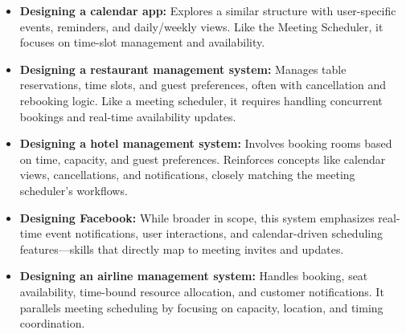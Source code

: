 \begin{itemize}
\item
\protect{}\label{euwRmqTf_2P4JGXqY1GlO}
\textbf{Designing a calendar app:} Explores a similar structure with user-specific events, reminders, and daily/weekly views. Like the Meeting Scheduler, it focuses on time-slot management and availability.
\item
\protect{}\label{9GEUsbY1YnVnW01c-IVVW}
\textbf{Designing a restaurant management system:} Manages table reservations, time slots, and guest preferences, often with cancellation and rebooking logic. Like a meeting scheduler, it requires handling concurrent bookings and real-time availability updates.
\item
\protect{}\label{1EG0RtqM_UbQRwEyptPsa}
\textbf{Designing a hotel management system:} Involves booking rooms based on time, capacity, and guest preferences. Reinforces concepts like calendar views, cancellations, and notifications, closely matching the meeting scheduler's workflows.
\item
\protect{}\label{44SOyW1kz4b27mk1IJX-O}
\textbf{Designing Facebook:} While broader in scope, this system emphasizes real-time event notifications, user interactions, and calendar-driven scheduling features---skills that directly map to meeting invites and updates.
\item
\protect{}\label{Y92vrtZbmoDOgHVLDIbUT}
\textbf{Designing an airline management system:} Handles booking, seat availability, time-bound resource allocation, and customer notifications. It parallels meeting scheduling by focusing on capacity, location, and timing coordination.
\end{itemize}

